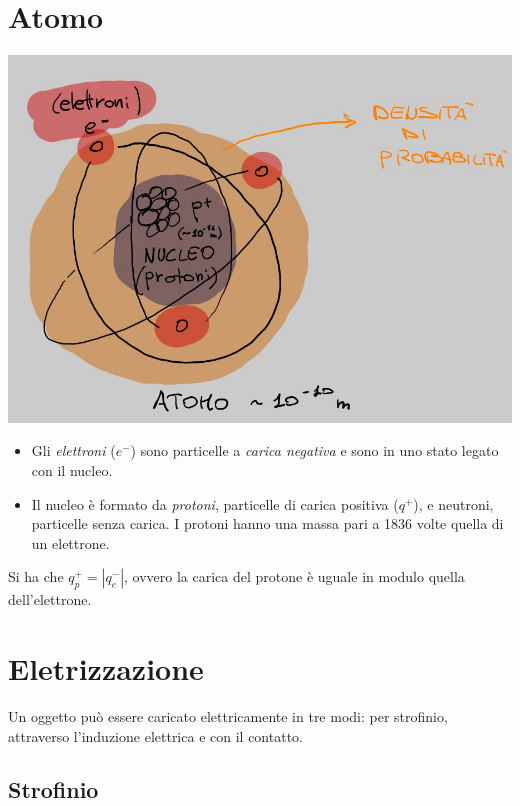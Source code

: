 \documentclass[a4peper, 12pt, twoside]{report}
\begin{document}
\section{Atomo}
\begin{multicols}{2}
    \begin{center}
        \includegraphics[scale=0.4]{atomo}
    \end{center}
    \begin{itemize}
        \item Gli \emph{elettroni} ($e^-$) sono particelle a \emph{carica negativa} e sono in uno stato legato con il nucleo.
        \item Il nucleo \`e formato da \emph{protoni}, particelle di carica positiva ($q^+$), e neutroni, particelle senza carica. 
        I protoni hanno una massa pari a 1836 volte quella di un elettrone.
    \end{itemize}
\end{multicols}

Si ha che $q_p^+ = | q_e^- |$, ovvero la carica del protone \`e uguale in modulo  quella dell'elettrone.

\section{Eletrizzazione}

Un oggetto pu\`o essere caricato elettricamente in tre modi: per strofinio, attraverso l'induzione elettrica
e con il contatto.

\subsection{Strofinio}
\end{document}

